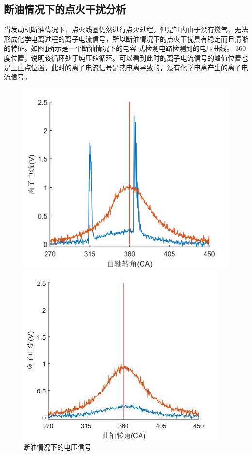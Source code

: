 \subsection{断油情况下的点火干扰分析}
当发动机断油情况下，点火线圈仍然进行点火过程，但是缸内由于没有燃气，无法形成化学电离过程的离子电流信号，所以断油情况下的点火干扰具有稳定而且清晰的特征。如图\ref{fig:dy_ion}所示是一个断油情况下的电容
式检测电路检测到的电压曲线。
360度位置，说明该循环处于纯压缩循环。可以看到此时的离子电流信号的峰值位置也是上止点位置，此时的离子电流信号是热电离导致的，没有化学电离产生的离子电流信号。
\begin{figure}[H]
\begin{minipage}[t]{0.5\linewidth}
	\centering
	\includegraphics[width=\textwidth]{thesis_figure/ion_chapter/dy_ion}
	\caption{断油情况下的电压信号}
	\label{fig:dy_ion}
\end{minipage}
\begin{minipage}[t]{0.5\linewidth}
	\centering
	\includegraphics[width=\textwidth]{thesis_figure/ion_chapter/dh_ion}

\end{minipage}
\end{figure}
